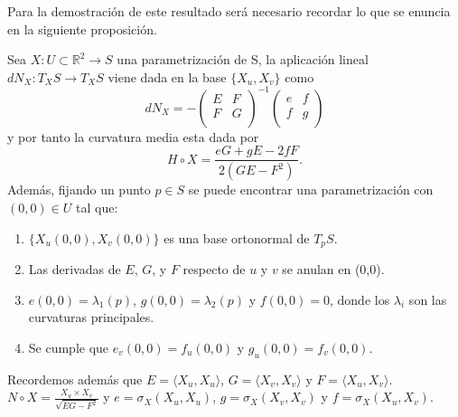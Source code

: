 	${ }$\\
	
	Para la demostración de este resultado será necesario recordar lo que se enuncia en la siguiente proposición.
	${ }$\\
	
	\begin{proposicion}
		Sea $X : U \subset \mathbb{R}^2 \to S$ una parametrización de S, la aplicación lineal $dN_X : T_X S \to T_X S$ viene dada en la base $\{X_u, X_v \}$ como
		${ }$\\
		\[
			dN_X = - \left( {\begin{array}{cc}
						E & F \\
						F & G \\
					\end{array} } \right)^{-1}
					\left( {\begin{array}{cc}
						e & f \\
						f & g \\
					\end{array} } \right)
		\]
		${ }$\\
		y por tanto la curvatura media esta dada por
		${ }$\\
		\[
			H \circ X = \frac{eG + gE -2fF}{2(GE-F^2)}.
		\]
		${ }$\\
		
		Además, fijando un punto $p \in S$ se puede encontrar una parametrización con $(0,0) \in U$ tal que:
		
		\begin{enumerate}
			\item $\{X_u(0,0), X_v(0,0) \}$ es una base ortonormal de $T_p S$.
			\item Las derivadas de $E$, $G$, y $F$ respecto de $u$ y $v$ se anulan en (0,0).
			\item $e(0,0) = \lambda_{1}(p)$, $g(0,0) = \lambda_{2}(p)$ y $f(0,0) = 0$, donde los $\lambda_i$ son las curvaturas principales.
			\item Se cumple que $e_v(0,0) = f_u(0,0)$ y $g_u(0,0) = f_v(0,0)$.
		\end{enumerate}
		
		Recordemos además que $E = \langle X_u, X_u \rangle$, $G = \langle X_v, X_v \rangle$ y $F = \langle X_u, X_v \rangle$. $N \circ X = \frac{X_u \times X_v}{\sqrt{EG-F^2}}$ y $e = \sigma_X(X_u, X_u)$, $g = \sigma_X(X_v, X_v)$ y $f = \sigma_X(X_u, X_v)$.
	\end{proposicion}
	${ }$
